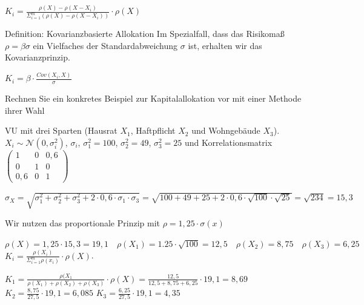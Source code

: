 \( K_{i} = \frac{\rho(X) - \rho(X - X_{i})}{\Sigma^{m}_{i = 1}(\rho(X) - \rho(X - X_{i}))} \cdot \rho(X) \)


Definition: Kovarianzbasierte Allokation 
Im Spezialfall, dass das Risikomaß  \( \rho = \beta\sigma \) ein Vielfaches der Standardabweichung  \( \sigma \) ist, 
erhalten wir das Kovarianzprinzip.

\( K_{i} = \beta \cdot \frac{Cov(X_{i}, X)}{\sigma} \)

Rechnen Sie ein konkretes Beispiel zur Kapitalallokation vor mit einer Methode ihrer Wahl

VU mit drei Sparten (Hausrat \( X_{1} \), Haftpflicht \( X_{2} \) und Wohngebäude \( X_{3} \)).
\( X_i \sim \mathcal{N}(0, \sigma_i^2) \), \( \sigma_i \), \( \sigma^{2}_{1} = 100 \), \( \sigma^{2}_{2} = 49 \),  \( \sigma^{2}_{3} = 25 \)
und Korrelationsmatrix  \( \left(\begin{array}{ccc}1 & 0 & 0,6 \\0 & 1 & 0 \\0,6 & 0 & 1\end{array}\right) \)

\( \sigma_{X} = \sqrt{\sigma^{2}_{1} + \sigma^{2}_{2} + \sigma^{2}_{3} + 2\cdot0,6\cdot\sigma_{1}\cdot\sigma_{3}} = \sqrt{100 + 49 + 25 + 2\cdot0,6\cdot\sqrt{100}\cdot\sqrt{25}} = \sqrt{234} = 15,3 \)


Wir nutzen das proportionale Prinzip mit \( \rho = 1,25\cdot\sigma(x) \)

\( \rho(X) = 1,25 \cdot 15,3 = 19,1 \quad \rho(X_{1}) = 1.25\cdot\sqrt{100} = 12,5 \quad \rho(X_{2}) = 8,75 \quad \rho(X_{3}) = 6,25 \)
\( K_{i} = \frac{\rho(X_{i})}{\Sigma^{m}_{i = 1}\rho(x_{i})} \cdot \rho(X) \).


\( K_{1} = \frac{\rho(X_{1}}{\rho(X_{1}) + \rho(X_{2}) + \rho(X_{3})} \cdot \rho(X) = \frac{12,5}{12,5 + 8,75 + 6,25} \cdot 19,1 = 8,69 \)
\(K_{2} = \frac{8,75}{27,5} \cdot 19,1 = 6,085 \)
\(K_{3} = \frac{6,25}{27,5} \cdot 19,1 = 4,35 \)




